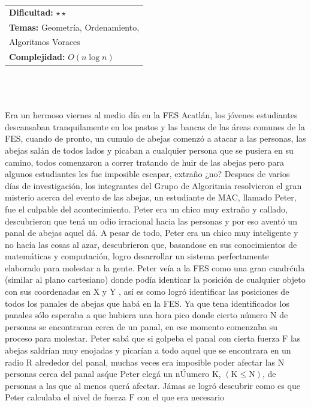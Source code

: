 \documentclass[12pt]{article}
\begin{document}
\hfill
\begin{tabular}{@{}l@{}}
\textbf{Dificultad:} $\star \star$ \\
\textbf{Temas:} Geometría, Ordenamiento, \\
Algoritmos Voraces \\
\textbf{Complejidad:} $O(n \log n)$
\end{tabular}\\
\\
\\Era un hermoso viernes al medio d\'ia en la FES Acatl\'an, los j\'ovenes estudiantes descansaban tranquilamente en los pastos y las bancas de las \'areas comunes de la FES, cuando de pronto, un cumulo de abejas comenz\'o a atacar a las personas, las abejas sal\'an de todos lados y picaban a cualquier persona que se pusiera en su camino, todos
comenzaron a correr tratando de huir de las abejas pero para algunos estudiantes les fue imposible escapar, extraño
¿no?
Despues de varios d\'ias de investigaci\'on, los integrantes del Grupo de Algoritmia resolvieron el gran misterio
acerca del evento de las abejas, un estudiante de MAC, llamado Peter, fue el culpable del acontecimiento. Peter era
un chico muy extraño y callado, descubrieron que ten\'a un odio irracional hacia las personas y por eso avent\'o un
panal de abejas aquel d\'a.
A pesar de todo, Peter era un chico muy inteligente y no hac\'ia las cosas al azar, descubrieron que, basandose
en sus conocimientos de matem\'aticas y computaci\'on, logro desarrollar un sistema perfectamente elaborado para
molestar a la gente. Peter ve\'ia a la FES como una gran cuadr\'cula (similar al plano cartesiano) donde pod\'ia
identicar la posici\'on de cualquier objeto con sus coordenadas en $\mathrm{X}$ y $\mathrm{Y}$ , as\'i es como logr\'o identificar las posiciones
de todos los panales de abejas que hab\'a en la FES. Ya que tena identificados los panales s\'olo esperaba a que hubiera
una hora pico donde cierto n\'umero N de personas se encontraran cerca de un panal, en ese momento comenzaba
su proceso para molestar. Peter sab\'a que si golpeba el panal con cierta fuerza $\mathrm{F}$ las abejas saldr\'ian muy enojadas
y picar\'ian a todo aquel que se encontrara en un radio $\mathrm{R}$ alrededor del panal, muchas veces era imposible poder
afectar las $\mathrm{N}$ personas cerca del panal as\' que Peter eleg\'a un n\'Uumero $\mathrm{K}$, $\mathrm{(K \leq N)}$, de personas a las que al menos
quer\'a afectar. J\'amas se logr\'o descubrir como es que Peter calculaba el nivel de fuerza $\mathrm{F}$ con el que era necesario
\end{document}
